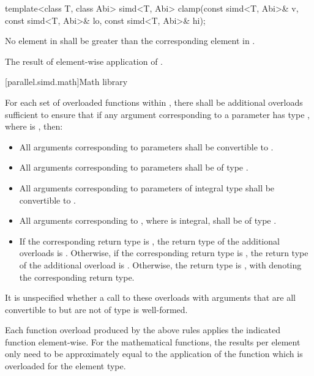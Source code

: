 \begin{itemdecl}
template<class T, class Abi> simd<T, Abi>
  clamp(const simd<T, Abi>& v, const simd<T, Abi>& lo, const simd<T, Abi>& hi);
\end{itemdecl}

\begin{itemdescr}
  \pnum\requires
  No element in  shall be greater than the corresponding element in .

  \pnum\returns
  The result of element-wise application of  \foralli.
\end{itemdescr}

[parallel.simd.math]{Math library}

\pnum
For each set of overloaded functions within , there shall be additional overloads sufficient to ensure that if any argument corresponding to a  parameter has type , where  is , then:
\begin{itemize}
  \item All arguments corresponding to  parameters shall be convertible to .
  \item All arguments corresponding to  parameters shall be of type .
  \item All arguments corresponding to parameters of integral type  shall be convertible to .
  \item All arguments corresponding to , where  is integral, shall be of type .
  \item If the corresponding return type is , the return type of the additional overloads is . Otherwise, if the corresponding return type is , the return type of the additional overload is . Otherwise, the return type is , with  denoting the corresponding return type.
\end{itemize}
It is unspecified whether a call to these overloads with arguments that are all convertible to  but are not of type  is well-formed.

\pnum
Each function overload produced by the above rules applies the indicated  function element-wise. For the mathematical functions, the results per element only need to be approximately equal to the application of the function which is overloaded for the element type.

